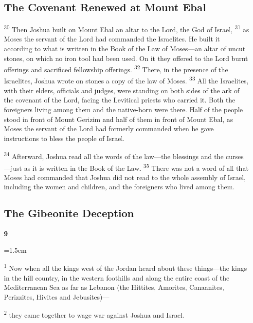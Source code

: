 \documentclass[12pt,twoside]{article}
\newcommand{\vs}[1]{\textsuperscript{#1}}
\newcommand{\chapterWithIndent}[2]{%
  \noindent
  \begin{minipage}[t]{1cm}
    \vspace{-0.4\baselineskip}
    {\fontsize{40pt}{48pt}\selectfont \textbf{#1}}
  \end{minipage}%
  \hspace{0.3cm}%
  \begin{minipage}[t]{\dimexpr\linewidth - 1.5cm - 0.3cm\relax}
    \hangindent=1.5em
    \hangafter=3
    #2
    \vspace{0.1cm}
  \end{minipage}
}
\begin{document}
\subsection*{\textbf{The Covenant Renewed at Mount Ebal}}

\vs{30} Then Joshua built on Mount Ebal an altar to the Lord, the God of Israel,
\vs{31} as Moses the servant of the Lord had commanded the Israelites. He built it according to what is written in the Book of the Law of Moses---an altar of uncut stones, on which no iron tool had been used. On it they offered to the Lord burnt offerings and sacrificed fellowship offerings.
\vs{32} There, in the presence of the Israelites, Joshua wrote on stones a copy of the law of Moses.
\vs{33} All the Israelites, with their elders, officials and judges, were standing on both sides of the ark of the covenant of the Lord, facing the Levitical priests who carried it. Both the foreigners living among them and the native-born were there. Half of the people stood in front of Mount Gerizim and half of them in front of Mount Ebal, as Moses the servant of the Lord had formerly commanded when he gave instructions to bless the people of Israel.

\vs{34} Afterward, Joshua read all the words of the law---the blessings and the curses---just as it is written in the Book of the Law.
\vs{35} There was not a word of all that Moses had commanded that Joshua did not read to the whole assembly of Israel, including the women and children, and the foreigners who lived among them.

\subsection*{\textbf{The Gibeonite Deception}}

\chapterWithIndent{9}{
  \vs{1} Now when all the kings west of the Jordan heard about these things---the kings in the hill country, in the western foothills and along the entire coast of the Mediterranean Sea as far as Lebanon (the Hittites, Amorites, Canaanites, Perizzites, Hivites and Jebusites)---
}

\noindent \vs{2} they came together to wage war against Joshua and Israel.

\end{document}
